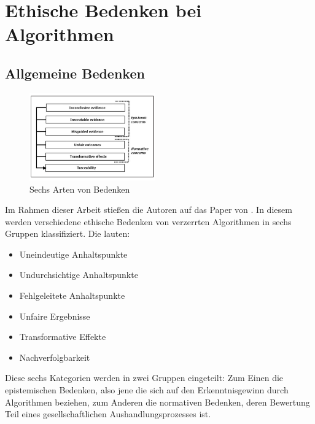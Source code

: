 \chapter{Ethische Bedenken bei Algorithmen}

\section{Allgemeine Bedenken}
\begin{figure}
	\vspace{-\baselineskip}
	\includegraphics[width=0.48\textwidth]{resources/ethical_concerns.png}
	\caption{Sechs Arten von Bedenken \\ \cite[S. 4, Figure 1]{Sagepub2016}}
	\label{fig:Ethische Bedenken}
\end{figure}
Im Rahmen dieser Arbeit stießen die Autoren auf das Paper  von \citeauthor{Sagepub2016}. In diesem werden verschiedene ethische Bedenken von verzerrten Algorithmen in sechs Gruppen klassifiziert. Die lauten:
\begin{itemize}
	\item Uneindeutige Anhaltspunkte
	\item Undurchsichtige Anhaltspunkte
	\item Fehlgeleitete Anhaltspunkte
	\item Unfaire Ergebnisse
	\item Transformative Effekte
	\item Nachverfolgbarkeit
\end{itemize}

Diese sechs Kategorien werden in zwei Gruppen eingeteilt: Zum Einen die epistemischen Bedenken, also jene die sich auf den Erkenntnisgewinn durch Algorithmen beziehen, zum Anderen die normativen Bedenken, deren Bewertung Teil eines gesellschaftlichen Aushandlungsprozesses ist.

